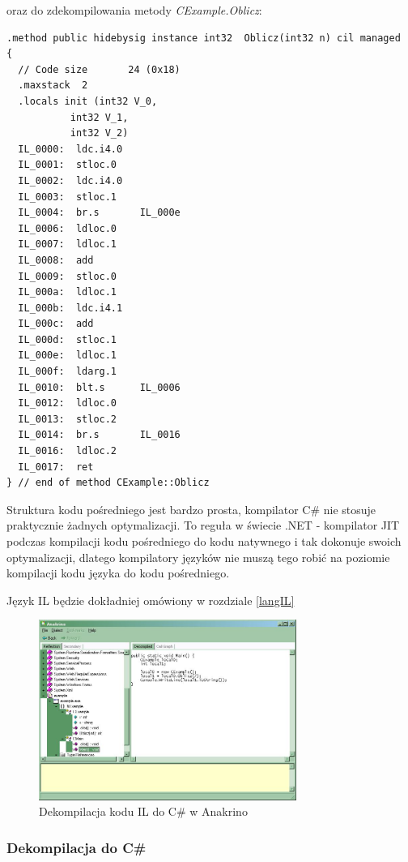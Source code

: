 oraz do zdekompilowania metody {\em CExample.Oblicz}:

\begin{scriptsize}
\begin{verbatim}
.method public hidebysig instance int32  Oblicz(int32 n) cil managed
{
  // Code size       24 (0x18)
  .maxstack  2
  .locals init (int32 V_0,
           int32 V_1,
           int32 V_2)
  IL_0000:  ldc.i4.0
  IL_0001:  stloc.0
  IL_0002:  ldc.i4.0
  IL_0003:  stloc.1
  IL_0004:  br.s       IL_000e
  IL_0006:  ldloc.0
  IL_0007:  ldloc.1
  IL_0008:  add
  IL_0009:  stloc.0
  IL_000a:  ldloc.1
  IL_000b:  ldc.i4.1
  IL_000c:  add
  IL_000d:  stloc.1
  IL_000e:  ldloc.1
  IL_000f:  ldarg.1
  IL_0010:  blt.s      IL_0006
  IL_0012:  ldloc.0
  IL_0013:  stloc.2
  IL_0014:  br.s       IL_0016
  IL_0016:  ldloc.2
  IL_0017:  ret
} // end of method CExample::Oblicz
\end{verbatim}
\end{scriptsize}

Struktura kodu pośredniego jest bardzo prosta, kompilator C\# nie stosuje praktycznie żadnych
optymalizacji. To reguła w świecie .NET - kompilator JIT podczas kompilacji kodu pośredniego do
kodu natywnego i tak dokonuje swoich optymalizacji, dlatego kompilatory języków nie muszą tego
robić na poziomie kompilacji kodu języka do kodu pośredniego.

Język IL będzie dokładniej omówiony w rozdziale \ref{langIL}

\begin{figure}
\begin{center}
\includegraphics[width=0.75\textwidth]{./pic/w05}
\caption{Dekompilacja kodu IL do C\# w Anakrino}
\end{center}
\end{figure}

\subsubsection{Dekompilacja do C\#}

